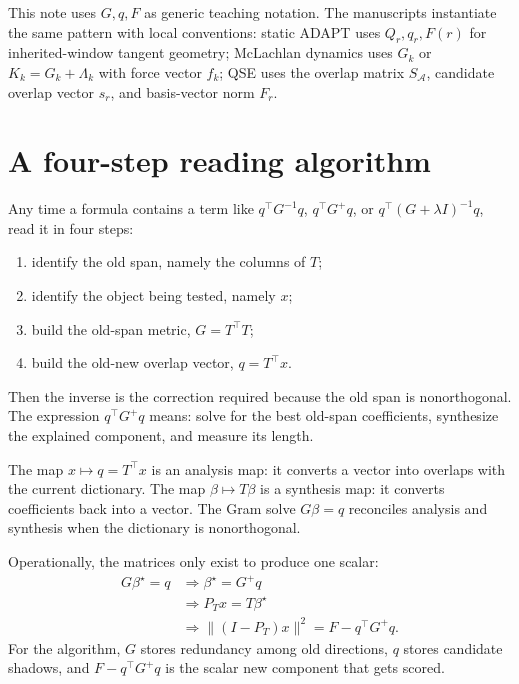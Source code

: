 \documentclass[10pt,twocolumn]{article}
\begin{document}
\begin{paperbox}
This note uses \(G,q,F\) as generic teaching notation. The manuscripts instantiate the same pattern with local conventions: static ADAPT uses \(Q_r,q_r,F(r)\) for inherited-window tangent geometry; McLachlan dynamics uses \(G_k\) or \(K_k=G_k+\Lambda_k\) with force vector \(f_k\); QSE uses the overlap matrix \(S_{\mathcal A}\), candidate overlap vector \(s_r\), and basis-vector norm \(F_r\).
\end{paperbox}

\section{A four-step reading algorithm}

Any time a formula contains a term like $q^\top G^{-1}q$, $q^\top G^+q$, or $q^\top(G+\lambda I)^{-1}q$, read it in four steps:
\begin{enumerate}
\item identify the old span, namely the columns of $T$;
\item identify the object being tested, namely $x$;
\item build the old-span metric, $G=T^\top T$;
\item build the old-new overlap vector, $q=T^\top x$.
\end{enumerate}
Then the inverse is the correction required because the old span is nonorthogonal. The expression $q^\top G^+q$ means: solve for the best old-span coefficients, synthesize the explained component, and measure its length.

\begin{jargonbox}
The map $x\mapsto q=T^\top x$ is an analysis map: it converts a vector into overlaps with the current dictionary. The map $\beta\mapsto T\beta$ is a synthesis map: it converts coefficients back into a vector. The Gram solve $G\beta=q$ reconciles analysis and synthesis when the dictionary is nonorthogonal.
\end{jargonbox}

Operationally, the matrices only exist to produce one scalar:
\begin{equation}
\begin{aligned}
G\beta^\star=q
&\Longrightarrow
\beta^\star=G^+q\\
&\Longrightarrow
P_Tx=T\beta^\star\\
&\Longrightarrow
\|(I-P_T)x\|^2=F-q^\top G^+q.
\end{aligned}
\label{eq:matrix_to_scalar_algorithm}
\end{equation}
For the algorithm, \(G\) stores redundancy among old directions, \(q\) stores candidate shadows, and \(F-q^\top G^+q\) is the scalar new component that gets scored.
\end{document}
